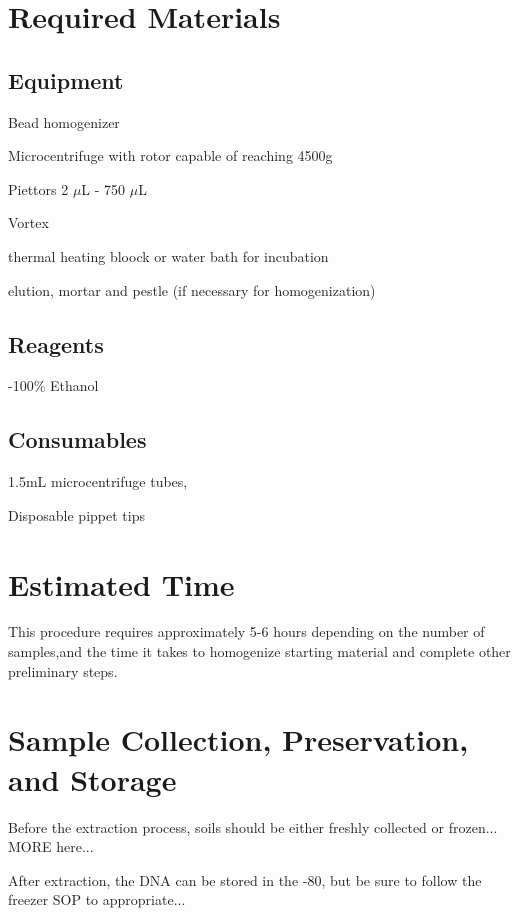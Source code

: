 \documentclass[12pt]{../SOP3_alpha}
\begin{document}
\section{Required Materials}

\subsection*{Equipment}

\NP Bead homogenizer

\NP Microcentrifuge with rotor capable of reaching 4500g

\NP Piettors 2 $\mu$L - 750 $\mu$L

\NP Vortex

\NP thermal heating bloock or water bath for incubation

\NP elution, mortar and pestle (if necessary for homogenization)

\subsection*{Reagents}

-100\% Ethanol 

\subsection*{Consumables}

\NP 1.5mL microcentrifuge tubes, 

\NP Disposable pippet tips

\section{Estimated Time}

\NP This procedure requires approximately 5-6 hours depending on the number of samples,and the time it takes to homogenize starting material and complete other preliminary steps. 

\section{Sample Collection, Preservation, and Storage}

\NP Before the extraction process, soils should be either freshly collected or frozen... MORE here...

\NP After extraction, the DNA can be stored in the -80\degree, but be sure to follow the freezer SOP to appropriate...
\end{document}
